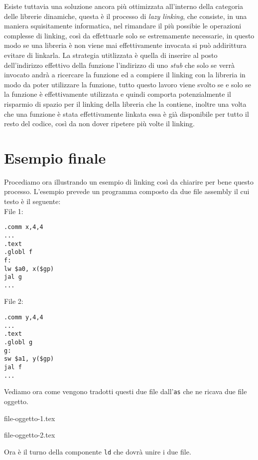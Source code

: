 \documentclass[class=book, crop=false, oneside]{standalone}
\begin{document}
Esiste tuttavia una soluzione ancora più ottimizzata all'interno della categoria delle librerie dinamiche, questa è il processo di \emph{lazy linking}, che consiste, in una maniera squisitamente informatica, nel rimandare il più possibie le operazioni complesse di linking, così da effettuarle solo se estremamente necessarie, in questo modo se una libreria è non viene mai effettivamente invocata si può addirittura evitare di linkarla.
La strategia utitlizzata è quella di inserire al posto dell'indirizzo effettivo della funzione l'indirizzo di uno \emph{stub} che solo se verrà invocato andrà a ricercare la funzione ed a compiere il linking con la libreria in modo da poter utilizzare la funzione, tutto questo lavoro viene svolto se e solo se la funzione è effettivamente utilizzata e quindi comporta potenzialmente il risparmio di spazio per il linking della libreria che la contiene, inoltre una volta che una funzione è stata effettivamente linkata essa è già disponibile per tutto il resto del codice, così da non dover ripetere più volte il linking.

\section{Esempio finale}
Procediamo ora illustrando un esempio di linking così da chiarire per bene questo processo.
L'esempio prevede un programma composto da due file assembly il cui testo è il seguente:\\
File 1:
\begin{verbatim}
.comm x,4,4
...
.text
.globl f
f:
lw $a0, x($gp)
jal g
...
\end{verbatim}
File 2:
\begin{verbatim}
.comm y,4,4
...
.text
.globl g
g:
sw $a1, y($gp)
jal f
...
\end{verbatim}
Vediamo ora come vengono tradotti questi due file dall'\texttt{as} che ne ricava due file oggetto.
\begin{table}[H]
	{file-oggetto-1.tex}
	\caption{File oggetto 1}
\end{table}
\begin{table}[H]
	{file-oggetto-2.tex}
	\caption{File oggetto 2}
\end{table}
Ora è il turno della componente \texttt{ld} che dovrà unire i due file.
\end{document}
